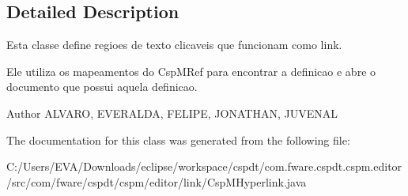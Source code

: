 \subsection{Detailed Description}
Esta classe define regioes de texto clicaveis que funcionam como link. 

Ele utiliza os mapeamentos do Csp\+M\+Ref para encontrar a definicao e abre o documento que possui aquela definicao.

\begin{DoxyAuthor}{Author}
A\+L\+V\+A\+RO, E\+V\+E\+R\+A\+L\+DA, F\+E\+L\+I\+PE, J\+O\+N\+A\+T\+H\+AN, J\+U\+V\+E\+N\+AL 
\end{DoxyAuthor}


The documentation for this class was generated from the following file\+:\begin{DoxyCompactItemize}
\item 
C\+:/\+Users/\+E\+V\+A/\+Downloads/eclipse/workspace/cspdt/com.\+fware.\+cspdt.\+cspm.\+editor/src/com/fware/cspdt/cspm/editor/link/Csp\+M\+Hyperlink.\+java\end{DoxyCompactItemize}
